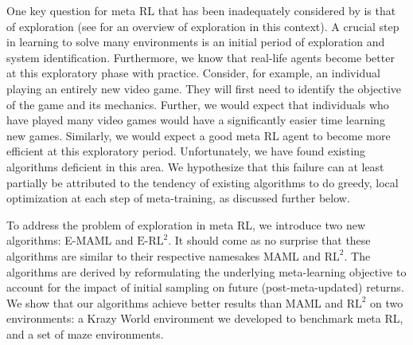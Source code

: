 \documentclass{article} %
\begin{document}
One key question for meta RL that has been inadequately considered by \cite{maml, rl2} is that of exploration (see \cite{schex2} for an overview of exploration in this context). A crucial step in learning to solve many environments is an initial period of exploration and system identification. Furthermore, we know that real-life agents become better at this exploratory phase with practice. Consider, for example, an individual playing an entirely new video game. They will first need to identify the objective of the game and its mechanics. Further, we would expect that individuals who have played many video games would have a significantly easier time learning new games. Similarly, we would expect a good meta RL agent to become more efficient at this exploratory period. Unfortunately, we have found existing algorithms deficient in this area. We hypothesize that this failure can at least partially be attributed to the tendency of existing algorithms to do greedy, local optimization at each step of meta-training, as discussed further below. 

To address the problem of exploration in meta RL, we introduce two new algorithms: E-MAML and $\text{E-RL}^2$. It should come as no surprise that these algorithms are similar to their respective namesakes MAML and $\text{RL}^2$. The algorithms are derived by reformulating the underlying meta-learning objective to account for the impact of initial sampling on future (post-meta-updated) returns. We show that our algorithms achieve better results than MAML and $\text{RL}^2$ on two environments: a Krazy World environment we developed to benchmark meta RL, and a set of maze environments. 


\end{document}
